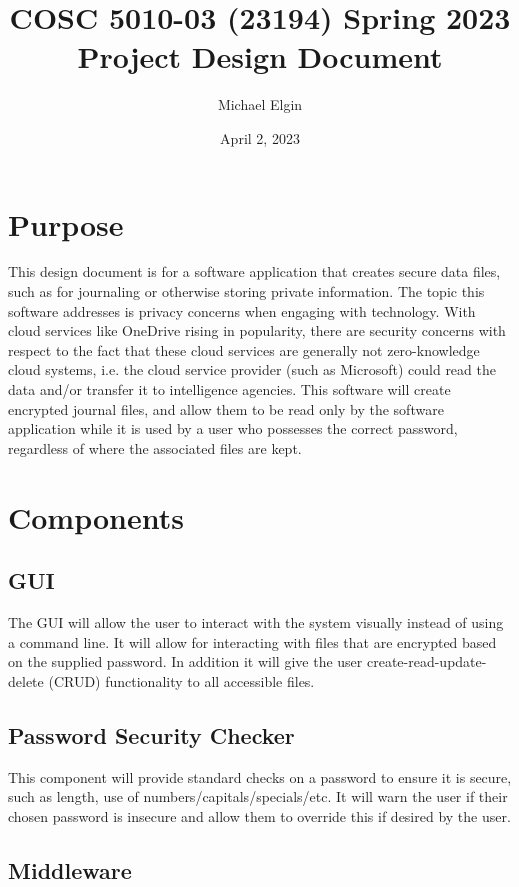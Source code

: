 \documentclass[12pt, letterpaper]{article}
\title{COSC 5010-03 (23194) Spring 2023 Project Design Document}
\author{Michael Elgin}
\date{April 2, 2023}
\begin{document}
\maketitle

\section{Purpose}

This design document is for a software application that creates secure data files, such as for journaling or otherwise storing private information. The topic this software addresses is privacy concerns when engaging with technology. With cloud services like OneDrive rising in popularity, there are security concerns with respect to the fact that these cloud services are generally not zero-knowledge cloud systems, i.e. the cloud service provider (such as Microsoft) could read the data and/or transfer it to intelligence agencies. This software will create encrypted journal files, and allow them to be read only by the software application while it is used by a user who possesses the correct password, regardless of where the associated files are kept.

\section{Components}
\subsection{GUI}

The GUI will allow the user to interact with the system visually instead of using a command line. It will allow for interacting with files that are encrypted based on the supplied password. In addition it will give the user create-read-update-delete (CRUD) functionality to all accessible files.

\subsection{Password Security Checker}

This component will provide standard checks on a password to ensure it is secure, such as length, use of numbers/capitals/specials/etc. It will warn the user if their chosen password is insecure and allow them to override this if desired by the user.

\subsection{Middleware}
\end{document}
